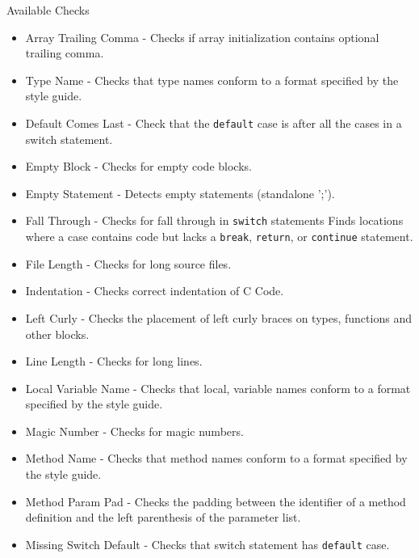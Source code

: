 \documentclass[compress]{beamer}
\begin{document}
\begin{frame}{Available Checks}
\begin{multicols}{2}
{\begin{enumerate}
{    \tiny{\begin{itemize}
        \item Array Trailing Comma - Checks if array initialization contains optional trailing comma.
        \item Type Name - Checks that type names conform to a format specified by the style guide. 
        \item Default Comes Last - Check that the \texttt{default} case is after all the cases in a switch statement.
         \item Empty Block - Checks for empty code blocks.
        \item Empty Statement - Detects empty statements (standalone ';'). 
        \item Fall Through - Checks for fall through in \texttt{switch} statements Finds locations where a case contains code 
        but lacks a \texttt{break}, \texttt{return}, or \texttt{continue} statement.
        \item File Length - Checks for long source files.
        \item Indentation - Checks correct indentation of C Code.
        \item Left Curly - Checks the placement of left curly braces on types, functions and other blocks. 
        \item Line Length - Checks for long lines.
        \item Local Variable Name - Checks that local, variable names conform to a format specified by the style guide.
        \item Magic Number - Checks for magic numbers.
        \item Method Name - Checks that method names conform to a format specified by the style guide.
        \item Method Param Pad - Checks the padding between the identifier of a method definition and the 
        left parenthesis of the parameter list.
        \item Missing Switch Default - Checks that switch statement has \texttt{default} case.
    \end{itemize}}}
\end{enumerate}}
\end{multicols}
\end{frame}
\end{document}
